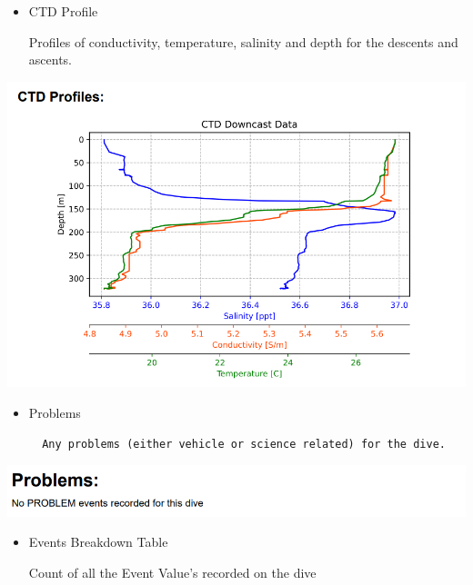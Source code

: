\documentclass[
  letterpaper,
  DIV=11,
  numbers=noendperiod]{scrreprt}
\begin{document}
\begin{itemize}
\item
  CTD Profile

  Profiles of conductivity, temperature, salinity and depth for the
  descents and ascents.
\end{itemize}

\includegraphics{images/image34.png}

\begin{itemize}
\item
  Problems

\begin{verbatim}
  Any problems (either vehicle or science related) for the dive. 
\end{verbatim}
\end{itemize}

\includegraphics{images/image24.png}

\begin{itemize}
\item
  Events Breakdown Table

  Count of all the Event Value's recorded on the dive
\end{itemize}
\end{document}
